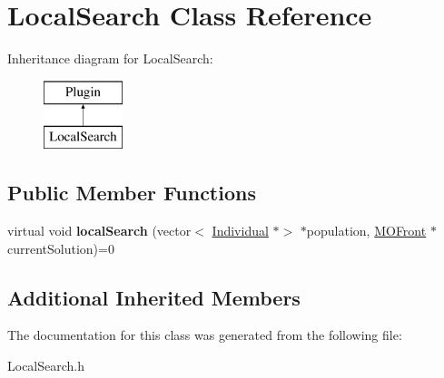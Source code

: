 \hypertarget{classLocalSearch}{}\section{Local\+Search Class Reference}
\label{classLocalSearch}
Inheritance diagram for Local\+Search\+:\begin{figure}[H]
\begin{center}
\leavevmode
\includegraphics[height=2.000000cm]{d9/d56/classLocalSearch}
\end{center}
\end{figure}
\subsection*{Public Member Functions}
\begin{DoxyCompactItemize}
\item 
\mbox{\label{classLocalSearch_a2b6d7b6455c6773c84e5f5a666870b42}} 
virtual void {\bfseries local\+Search} (vector$<$ \mbox{\hyperlink{classIndividual}{Individual}} $\ast$$>$ $\ast$population, \mbox{\hyperlink{classMOFront}{M\+O\+Front}} $\ast$current\+Solution)=0
\end{DoxyCompactItemize}
\subsection*{Additional Inherited Members}


The documentation for this class was generated from the following file\+:\begin{DoxyCompactItemize}
\item 
Local\+Search.\+h\end{DoxyCompactItemize}
